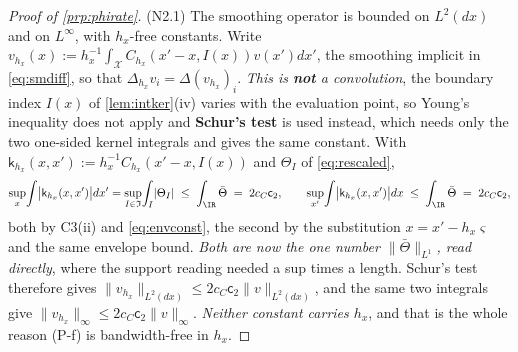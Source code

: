 \begin{proof}[Proof of \cref{prp:phirate}]
(N2.1) The smoothing operator is bounded on $L^{2}(dx)$ and on $L^{\infty}$, with $h_x$-free
constants. Write $v_{h_x}(x):=h_x^{-1}\!\int_{\mathcal X}C_{h_x}(x'-x,I(x))v(x')dx'$, the smoothing
implicit in \eqref{eq:smdiff}, so that $\Delta_{h_x}v_i=\Delta(v_{h_x})_i$. \emph{This is \textbf{not} a
convolution}, the boundary index $I(x)$ of \cref{lem:intker}(iv) varies with the evaluation point, 
so Young's inequality does not apply and \textbf{Schur's test} is used instead, which needs only the two
one-sided kernel integrals and gives the same constant. With
$\mathsf k_{h_x}(x,x'):=h_x^{-1}C_{h_x}(x'-x,I(x))$ and $\Theta_{I}$ of \eqref{eq:rescaled},
\[
\sup_x\!\int\!\big|\mathsf k_{h_x}(x,x')\big|dx'
=\sup_{I\in\mathfrak I}\!\int_{I}\!|\Theta_{I}|
\;\le\;\int_\IR\bar\Theta\;=\;2c_C\mathsf c_2,
\qquad
\sup_{x'}\!\int\!\big|\mathsf k_{h_x}(x,x')\big|dx\;\le\;\int_\IR\bar\Theta\;=\;2c_C\mathsf c_2 ,
\]
both by C3(ii) and \eqref{eq:envconst}, the second by the substitution $x=x'-h_x\varsigma$ and the same
envelope bound. \emph{Both are now the one number $\|\bar\Theta\|_{L^{1}}$, read directly}, where the
support reading needed a sup times a length.
Schur's test
therefore gives $\|v_{h_x}\|_{L^{2}(dx)}\le2c_C\mathsf c_2\|v\|_{L^{2}(dx)}$, and the same two integrals
give $\|v_{h_x}\|_\infty\le2c_C\mathsf c_2\|v\|_\infty$. \emph{Neither constant carries $h_x$}, and that
is the whole reason (P-f) is bandwidth-free in $h_x$.


\end{proof}
